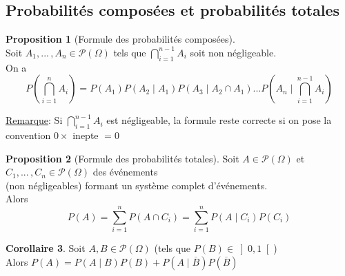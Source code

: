 \documentclass[10pt,a4paper]{article}
\theoremstyle{definition}
\newtheorem{proposition}{Proposition}[section]
\newtheorem{corollaire}[proposition]{Corollaire}
\begin{document}
\subsection{Probabilités composées et probabilités totales}
\begin{proposition}[Formule des probabilités composées]
\hfill \\
Soit $A_1, ...\,, A_n \in \mathcal{P}(\Omega)$ tels que $\bigcap\limits_{i = 1}^{n - 1} A_i$ soit non négligeable. \\
On a 
\[ P\left( \bigcap\limits_{i = 1}^n A_i \right) = P(A_1) P(A_2 \mid A_1) P(A_3 \mid A_2 \cap A_1) ... P\left( A_n \mid \bigcap\limits_{i = 1}^{n - 1} A_i \right) \]
\end{proposition}
\noindent \uline{Remarque}: Si $\bigcap\limits_{i = 1}^{n - 1} A_i$ est négligeable, la formule reste correcte si on pose la convention $0 \times $ inepte $= 0$
\begin{proposition}[Formule des probabilités totales]
Soit $A \in \mathcal{P}(\Omega)$ et $C_1, ...\,, C_n \in \mathcal{P}(\Omega)$ des événements \\
(non négligeables) formant un système complet d'événements. \\
Alors 
\[ P(A) = \sum_{i = 1}^n P(A \cap C_i) = \sum_{i = 1}^n P(A \mid C_i) P(C_i) \]
\end{proposition} 
\begin{corollaire}
Soit $A, B \in \mathcal{P}(\Omega)$ (tels que $P(B) \in \left] 0, 1 \right[$) \\
Alors $P(A) = P(A \mid B) P(B) + P(A \mid \overline{B}) P(\overline{B})$
\end{corollaire}
\end{document}
